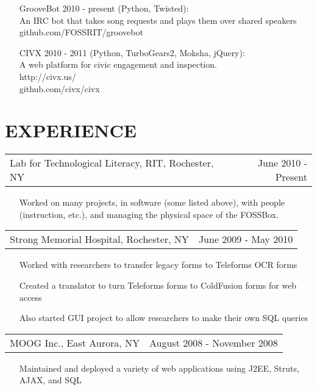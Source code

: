 \documentclass[line]{res}
\begin{document}
\begin{resume}
\begin{itemize}
        \item[GrooveBot]
            2010 - present (Python, Twisted):\\
            An IRC bot that takes song requests and plays them over shared speakers\\
            github.com/FOSSRIT/groovebot

        \item[CIVX]
            2010 - 2011 (Python, TurboGears2, Moksha, jQuery):\\
            A web platform for civic engagement and inspection.\\
            http://civx.us/\\
            github.com/civx/civx
    \end{itemize}

\section{EXPERIENCE}
    \begin{tabular}{p{3.5in} r} %
        Lab for Technological Literacy, RIT, Rochester, NY & June 2010 - Present
    \end{tabular}
        \begin{itemize} %
            \item[] Worked on many projects, in software (some listed above),
                with people (instruction, etc.), and managing the physical
                space of the FOSSBox.
        \end{itemize}
    \begin{tabular}{p{3.5in} r}
        Strong Memorial Hospital, Rochester, NY & June 2009 - May 2010
    \end{tabular}
    \begin{itemize}
        \item[] Worked with researchers to transfer legacy forms to Teleforms OCR forms
        \item[] Created a translator to turn Teleforms forms to ColdFusion forms for web access
        \item[] Also started GUI project to allow researchers to make their own SQL queries
    \end{itemize}
    \begin{tabular}{p{3.5in} r} %
        MOOG Inc., East Aurora, NY & August 2008 - November 2008
    \end{tabular}
    \begin{itemize}
        \item[] Maintained and deployed a variety of web applications using J2EE, Struts, AJAX, and SQL
    \end{itemize}


\end{resume}
\end{document}
